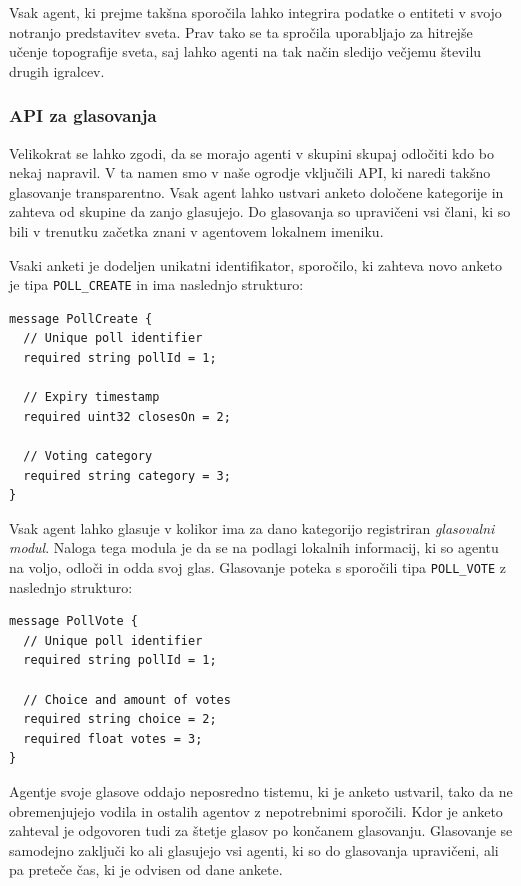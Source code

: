 \documentclass[a4paper,10pt]{article}
\begin{document}
\noindent
Vsak agent, ki prejme takšna sporočila lahko integrira podatke o entiteti v svojo notranjo predstavitev sveta. Prav tako se ta spročila uporabljajo za hitrejše učenje topografije sveta, saj lahko agenti na tak način sledijo večjemu številu drugih igralcev.

\subsubsection{API za glasovanja}

Velikokrat se lahko zgodi, da se morajo agenti v skupini skupaj odločiti kdo bo nekaj napravil. V ta namen smo v naše ogrodje vključili API, ki naredi takšno glasovanje transparentno. Vsak agent lahko ustvari anketo določene kategorije in zahteva od skupine da zanjo glasujejo. Do glasovanja so upravičeni vsi člani, ki so bili v trenutku začetka znani v agentovem lokalnem imeniku.

Vsaki anketi je dodeljen unikatni identifikator, sporočilo, ki zahteva novo anketo je tipa \texttt{POLL\_CREATE} in ima naslednjo strukturo:
\begin{verbatim}
message PollCreate {
  // Unique poll identifier
  required string pollId = 1;
  
  // Expiry timestamp
  required uint32 closesOn = 2;
  
  // Voting category
  required string category = 3;
}
\end{verbatim}

Vsak agent lahko glasuje v kolikor ima za dano kategorijo registriran \textit{glasovalni modul}. Naloga tega modula je da se na podlagi lokalnih informacij, ki so agentu na voljo, odloči in odda svoj glas. Glasovanje poteka s sporočili tipa \texttt{POLL\_VOTE} z naslednjo strukturo:
\begin{verbatim}
message PollVote {
  // Unique poll identifier
  required string pollId = 1;
  
  // Choice and amount of votes
  required string choice = 2;
  required float votes = 3;
}
\end{verbatim}

Agentje svoje glasove oddajo neposredno tistemu, ki je anketo ustvaril, tako da ne obremenjujejo vodila in ostalih agentov z nepotrebnimi sporočili. Kdor je anketo zahteval je odgovoren tudi za štetje glasov po končanem glasovanju. Glasovanje se samodejno zaključi ko ali glasujejo vsi agenti, ki so do glasovanja upravičeni, ali pa preteče čas, ki je odvisen od dane ankete.
\end{document}
